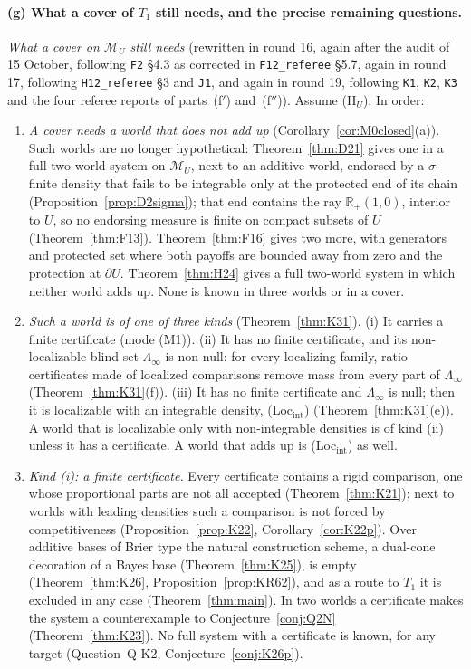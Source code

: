 \documentclass[11pt]{article}
\theoremstyle{definition}
\theoremstyle{remark}
\newcommand{\R}{\mathbb R}
\newcommand{\M}{\mathcal M}
\newcommand{\src}[1]{\texttt{#1}}
\begin{document}
\paragraph{(g) What a cover of $T_1$ still needs, and the precise remaining questions.} \emph{What a cover on $\M_U$ still needs} (rewritten in round 16, again after the audit of 15 October, following \src{F2} \S4.3 as corrected in \src{F12\_referee} \S5.7, again in round 17, following \src{H12\_referee} \S3 and \src{J1}, and again in round 19, following \src{K1}, \src{K2}, \src{K3} and the four referee reports of parts~(f$'$) and~(f$''$)). Assume (H$_U$). In order:
\begin{enumerate}[leftmargin=*,label=(\arabic*)]
\item \emph{A cover needs a world that does not add up} (Corollary~\ref{cor:M0closed}(a)). Such worlds are no longer hypothetical: Theorem~\ref{thm:D21} gives one in a full two-world system on $\M_U$, next to an additive world, endorsed by a $\sigma$-finite density that fails to be integrable only at the protected end of its chain (Proposition~\ref{prop:D2sigma}); that end contains the ray $\R_+(1,0)$, interior to $U$, so no endorsing measure is finite on compact subsets of $U$ (Theorem~\ref{thm:F13}). Theorem~\ref{thm:F16} gives two more, with generators and protected set where both payoffs are bounded away from zero and the protection at $\partial U$. Theorem~\ref{thm:H24} gives a full two-world system in which neither world adds up. None is known in three worlds or in a cover.
\item \emph{Such a world is of one of three kinds} (Theorem~\ref{thm:K31}). (i) It carries a finite certificate (mode (M1)). (ii) It has no finite certificate, and its non-localizable blind set $\Lambda_\infty$ is non-null: for every localizing family, ratio certificates made of localized comparisons remove mass from every part of $\Lambda_\infty$ (Theorem~\ref{thm:K31}(f)). (iii) It has no finite certificate and $\Lambda_\infty$ is null; then it is localizable with an integrable density, (Loc$_{\mathrm{int}}$) (Theorem~\ref{thm:K31}(e)). A world that is localizable only with non-integrable densities is of kind (ii) unless it has a certificate. A world that adds up is (Loc$_{\mathrm{int}}$) as well.
\item \emph{Kind (i): a finite certificate.} Every certificate contains a rigid comparison, one whose proportional parts are not all accepted (Theorem~\ref{thm:K21}); next to worlds with leading densities such a comparison is not forced by competitiveness (Proposition~\ref{prop:K22}, Corollary~\ref{cor:K22p}). Over additive bases of Brier type the natural construction scheme, a dual-cone decoration of a Bayes base (Theorem~\ref{thm:K25}), is empty (Theorem~\ref{thm:K26}, Proposition~\ref{prop:KR62}), and as a route to $T_1$ it is excluded in any case (Theorem~\ref{thm:main}). In two worlds a certificate makes the system a counterexample to Conjecture~\ref{conj:Q2N} (Theorem~\ref{thm:K23}). No full system with a certificate is known, for any target (Question~Q-K2, Conjecture~\ref{conj:K26p}).

\end{enumerate}
\end{document}
